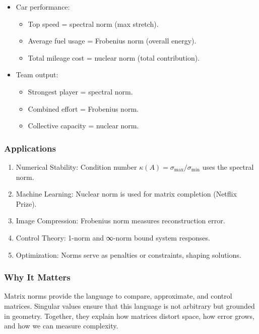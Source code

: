 \documentclass[
  letterpaper,
  DIV=11,
  numbers=noendperiod]{scrreprt}
\providecommand{\tightlist}{%
  \setlength{\itemsep}{0pt}\setlength{\parskip}{0pt}}
\begin{document}
\begin{itemize}
\item
  Car performance:

  \begin{itemize}
  \tightlist
  \item
    Top speed = spectral norm (max stretch).
  \item
    Average fuel usage = Frobenius norm (overall energy).
  \item
    Total mileage cost = nuclear norm (total contribution).
  \end{itemize}
\item
  Team output:

  \begin{itemize}
  \tightlist
  \item
    Strongest player = spectral norm.
  \item
    Combined effort = Frobenius norm.
  \item
    Collective capacity = nuclear norm.
  \end{itemize}
\end{itemize}

\subsubsection{Applications}\label{applications-46}

\begin{enumerate}
\def\labelenumi{\arabic{enumi}.}
\tightlist
\item
  Numerical Stability: Condition number
  \(\kappa(A) = \sigma_{\max}/\sigma_{\min}\) uses the spectral norm.
\item
  Machine Learning: Nuclear norm is used for matrix completion (Netflix
  Prize).
\item
  Image Compression: Frobenius norm measures reconstruction error.
\item
  Control Theory: 1-norm and ∞-norm bound system responses.
\item
  Optimization: Norms serve as penalties or constraints, shaping
  solutions.
\end{enumerate}

\subsubsection{Why It Matters}\label{why-it-matters-84}

Matrix norms provide the language to compare, approximate, and control
matrices. Singular values ensure that this language is not arbitrary but
grounded in geometry. Together, they explain how matrices distort space,
how error grows, and how we can measure complexity.
\end{document}
